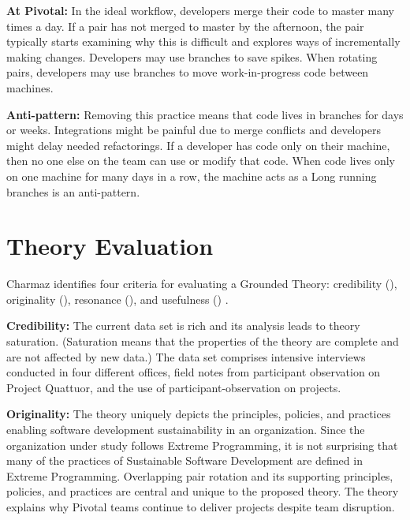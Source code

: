 \textbf{At Pivotal:} In the ideal workflow, developers merge their code to master many times a day. If a pair has not merged to master by the afternoon, the pair typically starts examining why this is difficult and explores ways of incrementally making changes. Developers may use branches to save spikes. When rotating pairs, developers may use branches to move work-in-progress code between machines. 

\textbf{Anti-pattern:} Removing this practice means that code lives in branches for days or weeks. Integrations might be painful due to merge conflicts and developers might delay needed refactorings. If a developer has code only on their machine, then no one else on the team can use or modify that code. When code lives only on one machine for many days in a row, the machine acts as a  Long running branches is an anti-pattern.
\section{Theory Evaluation}
\label{TheoryEvaluation}

Charmaz identifies four criteria for evaluating a Grounded Theory: credibility (), originality (), resonance (), and usefulness () \cite{StolGroundedTheory}. 

\textbf{Credibility:} The current data set is rich and its analysis leads to theory saturation. (Saturation means that the properties of the theory are complete and are not affected by new data.) The data set comprises \numberOfInterviews{} intensive interviews conducted in four different offices, field notes from participant observation on Project Quattuor, and the use of participant-observation on \numberOfObservedProjects{} projects.

\textbf{Originality:} The theory uniquely depicts the principles, policies, and practices enabling software development sustainability in an organization. Since the organization under study follows Extreme Programming, it is not surprising that many of the practices of Sustainable Software Development are defined in Extreme Programming. Overlapping pair rotation and its supporting principles, policies, and practices are central and unique to the proposed theory. The theory explains why Pivotal teams continue to deliver projects despite team disruption. 

